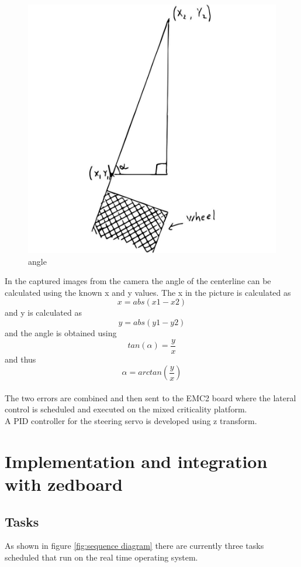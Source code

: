 \begin{figure}[H]
  \includegraphics[scale=0.25]{./img/angle.JPG}
  \centering
  \caption{angle}
  \label{fig:angle}
\end{figure}


In the captured images from the camera the angle of the centerline can be calculated using the known x and y values. The x in the picture is calculated as $$x = abs(x1-x2)$$ and y is calculated as $$y=abs(y1-y2)$$ and the angle is obtained using $$tan(\alpha)=\frac{y}{x}$$ and thus $$\alpha = arctan(\frac{y}{x})$$\\

The two errors are combined and then sent to the EMC2 board where the lateral control is scheduled and executed on the mixed criticality platform.\\

A PID controller for the steering servo is developed using z transform.



\section{Implementation and integration with zedboard}
\subsection{Tasks}
As shown in figure \ref{fig:sequence diagram} there are currently three tasks scheduled that run on the real time operating system.

